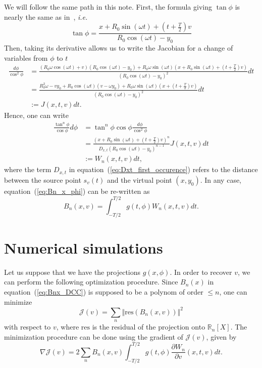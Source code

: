 \documentclass[a4paper]{article}
\numberwithin{equation}{section}
\newcommand{\R}{\mathbb{R}}
\begin{document}
We will follow the same path in this note. First, the formula giving $\tan \phi$ is nearly the same as in~\cite{clackdoyle2015consistency}, \emph{i.e.}
$$
\tan \phi = \frac{x + R_0 \sin(\omega t) + \left( t + \frac{T}{2} \right)v}{R_0 \cos(\omega t) - y_0}
$$
Then, taking its derivative allows us to write the Jacobian for a change of variables from $\phi$ to $t$
\begin{align*}
\frac{d\phi}{\cos^2 \phi} &= \frac{ \left( R_0 \omega \cos(\omega t) +v \right) \left( R_0 \cos(\omega t) - y_0 \right) + R_0 \omega \sin(\omega t) \left( x + R_0 \sin(\omega t) + \left( t + \frac{T}{2} \right)v \right) }{ \left( R_0 \cos(\omega t) - y_0 \right)^2 } dt \\
 &= \frac{ R_0^2 \omega - v y_0 + R_0 \cos(\omega t)(v-\omega y_0) + R_0 \omega \sin(\omega t)(x + \left( t + \frac{T}{2} \right)v ) }{ \left( R_0 \cos(\omega t) - y_0 \right)^2 } dt\\
 &:= J(x,t,v) dt.
\end{align*}
Hence, one can write
\begin{align}
	\frac{\tan^n \phi}{\cos \phi} d\phi &= \tan^n \phi \cos \phi \frac{d\phi}{\cos^2 \phi} \\
	&= \frac{ \left( x+R_0 \sin(\omega t) + \left( t + \frac{T}{2} \right)v \right)^n }{D_{x,t} \left( R_0 \cos(\omega t) - y_0 \right)^{n-1}} J(x,t,v) dt \label{eq:Dxt_first_occurence} \\
	&:= W_n(x,t,v) dt,
\end{align}
where the term $D_{x,t}$ in equation~(\ref{eq:Dxt_first_occurence}) refers to the distance between the source point $s_v(t)$ and the virtual point $(x,y_0)$.
In any case, equation~(\ref{eq:Bn_x_phi}) can be re-written as
\begin{equation}
	B_n(x,v) = \int_{-T/2}^{T/2} g(t,\phi) W_n(x,t,v) dt.
	\label{eq:Bnx_DCC}
\end{equation}

\section{Numerical simulations}

Let us suppose that we have the projections $g(x,\phi)$. In order to recover $v$, we can perform the following optimization procedure. Since $B_n(x)$ in equation~(\ref{eq:Bnx_DCC}) is supposed to be a polynom of order $\leq n$, one can minimize
\begin{equation}
	\mathcal{J}(v) = \sum_n \Vert \textrm{res} \left( B_n(x,v) \right) \Vert^2
\end{equation}
with respect to $v$, where $\textrm{res}$ is the residual of the projection onto $\R_n[X]$. The minimization procedure can be done using the gradient of $\mathcal{J}(v)$, given by
\begin{equation}
	\nabla \mathcal{J}(v) = 2 \sum_n B_n(x,v) \int_{-T/2}^{T/2} g(t,\phi) \frac{\partial W_n}{\partial v}(x,t,v) dt.
\end{equation}



\end{document}
